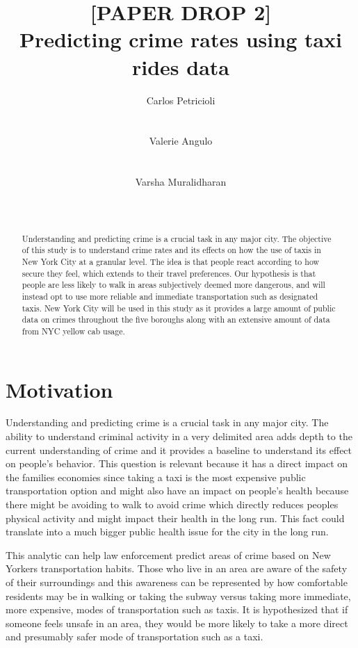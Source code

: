 \documentclass{sigkddExp}
\title{[PAPER DROP 2]\\
Predicting crime rates using taxi rides data}
\author{
\alignauthor Carlos Petricioli \\
       \affaddr{New York University}\\
       \affaddr{New York, USA}\\
       \email{petricioli@nyu.edu}
\alignauthor Valerie Angulo\\
       \affaddr{New York University}\\
       \affaddr{New York, USA}\\
       \email{vaa238@nyu.edu}
\alignauthor Varsha Muralidharan \\
       \affaddr{New York University}\\
       \affaddr{New York, USA}\\
       \email{vm1370@nyu.edu}
}
\begin{document}
\maketitle

\begin{abstract}

Understanding and predicting crime is a crucial task in any major city. The objective of this study is to understand crime rates and its effects on how the use of taxis in New York City at a granular level. The idea  is that people react according to how secure they feel, which extends to their travel preferences. 
Our hypothesis is that people are less likely to walk in areas subjectively deemed more dangerous, and will instead opt to use more reliable and immediate transportation such as designated taxis. 
New York City will be used in this study as it provides a large amount of public data on crimes throughout the five boroughs along with an extensive amount of data from NYC yellow cab usage. 


\end{abstract}




\section{Motivation}

Understanding and predicting crime is a crucial task in any major city. 
The ability to understand criminal activity in a very delimited area adds depth to the current understanding of crime and  it provides a baseline to understand its effect on people's behavior. 
This question is relevant because it has a direct impact on the families economies since taking a taxi is the most expensive public transportation option and might also have an impact on people's health because there might be avoiding to walk to avoid crime which directly reduces peoples physical activity and might impact their health in the long run. 
This fact could translate into a much bigger public health issue for the city in the long run. %

This analytic can help law enforcement predict areas of crime based on New Yorkers transportation habits. Those who live in an area are aware of the safety of their surroundings and this awareness can be represented by how comfortable residents may be in walking or taking the subway versus taking more immediate, more expensive, modes of transportation such as taxis. It is hypothesized that if someone feels unsafe in an area, they would be more likely to take a more direct and presumably safer mode of transportation such as a taxi. 
\end{document}
